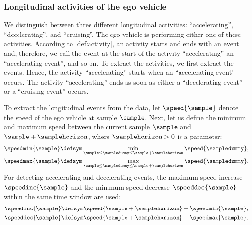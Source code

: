 \subsubsection{Longitudinal activities of the ego vehicle}
\label{sec:longitudinal ego}

We distinguish between three different longitudinal activities: ``accelerating'', ``decelerating'', and ``cruising''. The ego vehicle is performing either one of these activities. According to \cref{def:activity}, an activity starts and ends with an event and, therefore, we call the event at the start of the activity ``accelerating'' an ``accelerating event'', and so on. To extract the activities, we first extract the events. Hence, the activity ``accelerating'' starts when an ``accelerating event'' occurs. The activity ``accelerating'' ends as soon as either a ``decelerating event'' or a ``cruising event'' occurs.


To extract the longitudinal events from the data, let $\speed{\sample}$ denote the speed of the ego vehicle at sample $\sample$. Next, let us define the minimum and maximum speed between the current sample $\sample$ and $\sample+\samplehorizon$, where $\samplehorizon>0$ is a parameter:
\begin{align}
	\speedmin{\sample} &\defsym \min_{\sample \leq \sampledummy \leq \sample+\samplehorizon} \speed{\sampledummy}, \\
	\speedmax{\sample} &\defsym \max_{\sample \leq \sampledummy \leq \sample+\samplehorizon} \speed{\sampledummy}.
\end{align}
For detecting accelerating and decelerating events, the maximum speed increase $\speedinc{\sample}$ and the minimum speed decrease $\speeddec{\sample}$ within the same time window are used:
\begin{align}
	\speedinc{\sample} &\defsym \speed{\sample + \samplehorizon} - \speedmin{\sample},\\
	\speeddec{\sample} &\defsym \speed{\sample + \samplehorizon} - \speedmax{\sample}.
\end{align}

